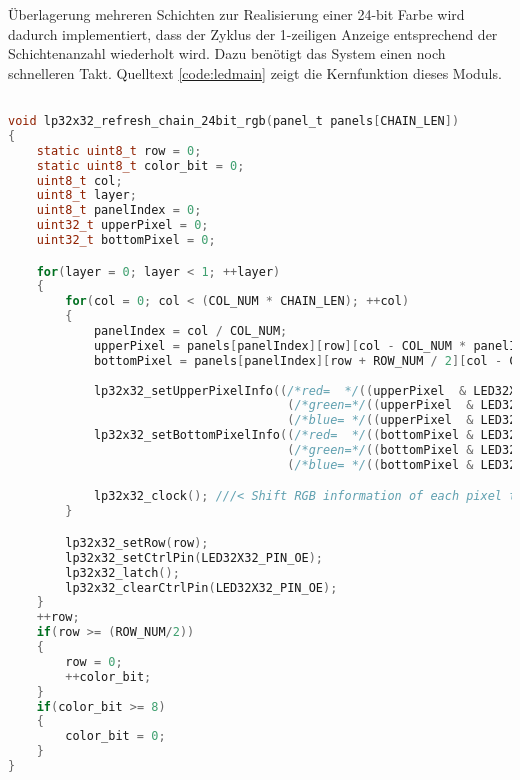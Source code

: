 Überlagerung mehreren Schichten zur Realisierung einer 24-bit Farbe wird dadurch implementiert, dass der Zyklus der 1-zeiligen Anzeige entsprechend der Schichtenanzahl wiederholt wird. Dazu benötigt das System einen noch schnelleren Takt. Quelltext \ref{code:ledmain} zeigt die Kernfunktion dieses Moduls.

\begin{lstlisting}[language={c}, caption={Schritte von Panel-Anzeige}, label={code:ledmain}]

void lp32x32_refresh_chain_24bit_rgb(panel_t panels[CHAIN_LEN])
{
    static uint8_t row = 0;
    static uint8_t color_bit = 0;
    uint8_t col;
    uint8_t layer;
    uint8_t panelIndex = 0;
    uint32_t upperPixel = 0;
    uint32_t bottomPixel = 0;

    for(layer = 0; layer < 1; ++layer)
    {
        for(col = 0; col < (COL_NUM * CHAIN_LEN); ++col)
        {
            panelIndex = col / COL_NUM;
            upperPixel = panels[panelIndex][row][col - COL_NUM * panelIndex].particle_count;
            bottomPixel = panels[panelIndex][row + ROW_NUM / 2][col - COL_NUM * panelIndex].particle_count;
            
            lp32x32_setUpperPixelInfo((/*red=  */((upperPixel  & LED32X32_RGB24_R_MASK) >> 16) & (0x01 << color_bit)), 
                                       (/*green=*/((upperPixel  & LED32X32_RGB24_G_MASK) >>  8) & (0x01 << color_bit)),
                                       (/*blue= */((upperPixel  & LED32X32_RGB24_B_MASK)      ) & (0x01 << color_bit)));
            lp32x32_setBottomPixelInfo((/*red=  */((bottomPixel & LED32X32_RGB24_R_MASK) >> 16) & (0x01 << color_bit)), 
                                       (/*green=*/((bottomPixel & LED32X32_RGB24_G_MASK) >>  8) & (0x01 << color_bit)),
                                       (/*blue= */((bottomPixel & LED32X32_RGB24_B_MASK)      ) & (0x01 << color_bit)));

            lp32x32_clock(); ///< Shift RGB information of each pixel to horizontal direction
        }

        lp32x32_setRow(row);
        lp32x32_setCtrlPin(LED32X32_PIN_OE);
        lp32x32_latch();
        lp32x32_clearCtrlPin(LED32X32_PIN_OE);
    }
    ++row;
    if(row >= (ROW_NUM/2))
    {
        row = 0;
        ++color_bit;
    }
    if(color_bit >= 8)
    {
        color_bit = 0;
    }
}
\end{lstlisting}
